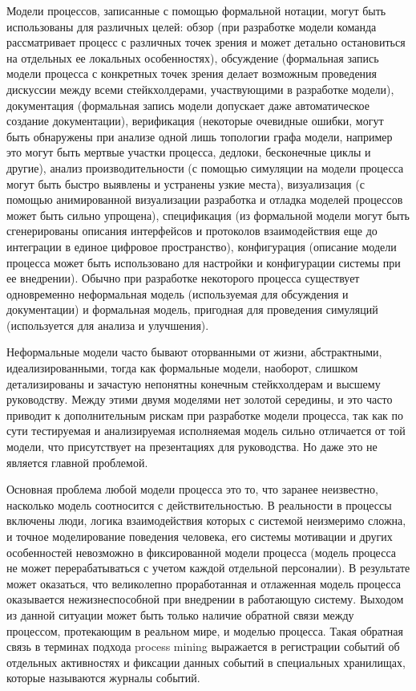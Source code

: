 \documentclass[
11pt,%
tightenlines,%
twoside,%
onecolumn,%
nofloats,%
nobibnotes,%
nofootinbib,%
superscriptaddress,%
noshowpacs,%
centertags]%
{revtex4}
\begin{document}
Модели процессов, записанные с помощью формальной нотации, могут быть использованы для различных целей: обзор (при разработке модели команда рассматривает процесс с различных точек зрения и может детально остановиться на отдельных ее локальных особенностях), обсуждение (формальная запись модели процесса с конкретных точек зрения делает возможным проведения дискуссии между всеми стейкхолдерами, участвующими в разработке модели), документация (формальная запись модели допускает даже автоматическое создание документации), верификация (некоторые очевидные ошибки, могут быть обнаружены при анализе одной лишь топологии графа модели, например это могут быть мертвые участки процесса, дедлоки, бесконечные циклы и другие), анализ производительности (с помощью симуляции на модели процесса могут быть быстро выявлены и устранены узкие места), визуализация (с помощью анимированной визуализации разработка и отладка моделей процессов может быть сильно упрощена), спецификация (из формальной модели могут быть сгенерированы описания интерфейсов и протоколов взаимодействия еще до интеграции в единое цифровое пространство), конфигурация (описание модели процесса может быть использовано для настройки и конфигурации системы при ее внедрении).
Обычно при разработке некоторого процесса существует одновременно неформальная модель (используемая для обсуждения и документации) и формальная модель, пригодная для проведения симуляций (используется для анализа и улучшения). 

Неформальные модели часто бывают оторванными от жизни, абстрактными, идеализированными, тогда как формальные модели, наоборот, слишком детализированы и зачастую непонятны конечным стейкхолдерам и высшему руководству.
Между этими двумя моделями нет золотой середины, и это часто приводит к дополнительным рискам при разработке модели процесса, так как по сути тестируемая и анализируемая исполняемая модель сильно отличается от той модели, что присутствует на презентациях для руководства.
Но даже это не является главной проблемой.

Основная проблема любой модели процесса это то, что заранее неизвестно, насколько модель соотносится с действительностью.
В реальности в процессы включены люди, логика взаимодействия которых с системой неизмеримо сложна, и точное моделирование поведения человека, его системы мотивации и других особенностей невозможно в фиксированной модели процесса (модель процесса не может перерабатываться с учетом каждой отдельной персоналии).
В результате может оказаться, что великолепно проработанная и отлаженная модель процесса оказывается нежизнеспособной при внедрении в работающую систему.
Выходом из данной ситуации может быть только наличие обратной связи между процессом, протекающим в реальном мире, и моделью процесса.
Такая обратная связь в терминах подхода process mining выражается в регистрации событий об отдельных активностях и фиксации данных событий в специальных хранилищах, которые называются журналы событий.
\end{document}
